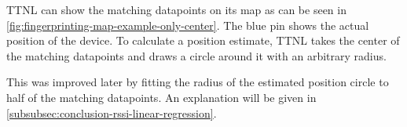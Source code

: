 \ac{TTNL} can show the matching datapoints on its map as can be seen in \cref{fig:fingerprinting-map-example-only-center}.
The blue pin shows the actual position of the device.
To calculate a position estimate, \ac{TTNL} takes the center of the matching datapoints and draws a circle around it with an arbitrary radius.

This was improved later by fitting the radius of the estimated position circle to half of the matching datapoints.
An explanation will be given in \cref{subsubsec:conclusion-rssi-linear-regression}.